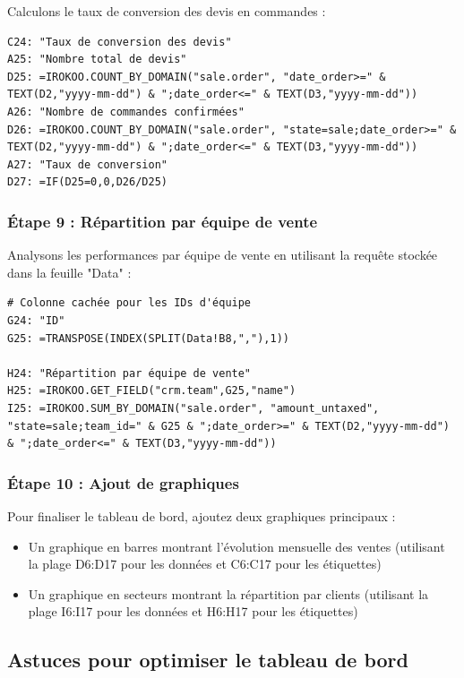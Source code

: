 \documentclass[12pt, a4paper]{article}
\begin{document}
Calculons le taux de conversion des devis en commandes :

\begin{lstlisting}
C24: "Taux de conversion des devis"
A25: "Nombre total de devis"
D25: =IROKOO.COUNT_BY_DOMAIN("sale.order", "date_order>=" & TEXT(D2,"yyyy-mm-dd") & ";date_order<=" & TEXT(D3,"yyyy-mm-dd"))
A26: "Nombre de commandes confirmées"
D26: =IROKOO.COUNT_BY_DOMAIN("sale.order", "state=sale;date_order>=" & TEXT(D2,"yyyy-mm-dd") & ";date_order<=" & TEXT(D3,"yyyy-mm-dd"))
A27: "Taux de conversion"
D27: =IF(D25=0,0,D26/D25)
\end{lstlisting}

\subsubsection{Étape 9 : Répartition par équipe de vente}

Analysons les performances par équipe de vente en utilisant la requête stockée dans la feuille "Data" :

\begin{lstlisting}
# Colonne cachée pour les IDs d'équipe
G24: "ID"
G25: =TRANSPOSE(INDEX(SPLIT(Data!B8,","),1))

H24: "Répartition par équipe de vente"
H25: =IROKOO.GET_FIELD("crm.team",G25,"name")
I25: =IROKOO.SUM_BY_DOMAIN("sale.order", "amount_untaxed", "state=sale;team_id=" & G25 & ";date_order>=" & TEXT(D2,"yyyy-mm-dd") & ";date_order<=" & TEXT(D3,"yyyy-mm-dd"))
\end{lstlisting}

\subsubsection{Étape 10 : Ajout de graphiques}

Pour finaliser le tableau de bord, ajoutez deux graphiques principaux :

\begin{itemize}
    \item Un graphique en barres montrant l'évolution mensuelle des ventes (utilisant la plage D6:D17 pour les données et C6:C17 pour les étiquettes)
    \item Un graphique en secteurs montrant la répartition par clients (utilisant la plage I6:I17 pour les données et H6:H17 pour les étiquettes)
\end{itemize}

\subsection{Astuces pour optimiser le tableau de bord}
\end{document}

